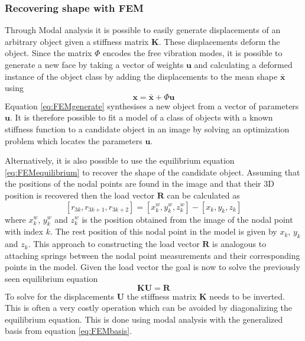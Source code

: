 \documentclass[11pt,a4paper]{report}
\begin{document}
\subsubsection{Recovering shape with FEM} 
Through Modal analysis it is possible to easily generate displacements of an
arbitrary object given a
stiffness matrix $\mathbf{K}$. These displacements deform the object. Since the
matrix $\Phi$ encodes the free vibration modes, it is possible to generate a new
face by taking a vector of weights $\mathbf{u}$ and calculating a deformed
instance of the object class by adding the displacements to the mean shape
$\mathbf{\bar{x}}$ using
\begin{equation}\label{eq:FEMgenerate}
\mathbf{x} =  \mathbf{\bar{x}} + \Phi\mathbf{u}
\end{equation}
Equation \ref{eq:FEMgenerate} synthesises a new object from a vector of
parameters $\mathbf{u}$. It is therefore possible to fit a model of a class
of objects with a known stiffness function to a candidate object in an
image by solving an optimization problem which locates the parameters $\mathbf{u}$.

Alternatively, it is also possible to use the equilibrium equation
\ref{eq:FEMequilibrium} to recover the shape of the candidate object. Assuming
that the positions of the nodal points are found in the image and that their 3D
position is recovered then the load vector $\mathbf{R}$ can be calculated as
\begin{equation}\label{eq:FEMload}
[r_{3k}, r_{3k+1}, r_{3k+2}] = [x^w_{k}, y^w_{k}, z^w_{k}] - [x_{k}, y_{k},
  z_{k}]
\end{equation}
where $x^w_{k}$, $y^w_{k}$ and $z^w_{k}$ is the position obtained from the image of the nodal point
with index $k$. The rest position of this nodal point in the model is given by
$x_{k}$, $y_{k}$ and $z_{k}$. This approach to constructing the load vector
$\mathbf{R}$ is analogous to attaching springs between the nodal point
measurements and their corresponding points in the model. Given the load vector
the goal is now to solve the previously seen equilibrium equation 
\begin{equation}
\mathbf{K}\mathbf{U} = \mathbf{R}
\end{equation}
To solve for the displacements $\mathbf{U}$ the stiffness matrix $\mathbf{K}$
needs to be inverted. This is often a very costly operation which can be avoided
by diagonalizing the equilibrium equation. This is done using modal analysis
with the generalized
basis from equation \ref{eq:FEMbasis}.
\end{document}

